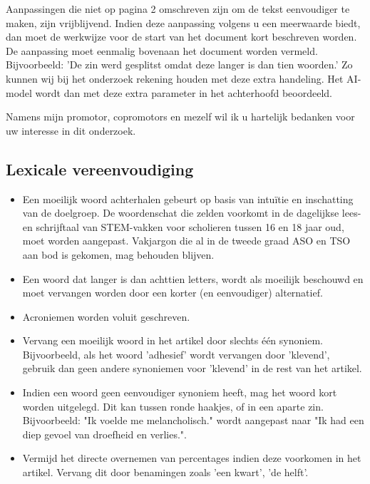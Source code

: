 	\medspace
	
Aanpassingen die niet op pagina 2 omschreven zijn om de tekst eenvoudiger te maken, zijn vrijblijvend. Indien deze aanpassing volgens u een meerwaarde biedt, dan moet de werkwijze voor de start van het document kort beschreven worden. De aanpassing moet eenmalig bovenaan het document worden vermeld. Bijvoorbeeld: 'De zin werd gesplitst omdat deze langer is dan tien woorden.' Zo kunnen wij bij het onderzoek rekening houden met deze extra handeling. Het AI-model wordt dan met deze extra parameter in het achterhoofd beoordeeld.
	
	\medspace
	
Namens mijn promotor, copromotors en mezelf wil ik u hartelijk bedanken voor uw interesse in dit onderzoek.
	
	\newpage
	
\subsection{Lexicale vereenvoudiging}
	
\begin{itemize}
	\item Een moeilijk woord achterhalen gebeurt op basis van intuïtie en inschatting van de doelgroep. De woordenschat die zelden voorkomt in de dagelijkse lees- en schrijftaal van STEM-vakken voor scholieren tussen 16 en 18 jaar oud, moet worden aangepast. Vakjargon die al in de tweede graad ASO en TSO aan bod is gekomen, mag behouden blijven.
	\item Een woord dat langer is dan achttien letters, wordt als moeilijk beschouwd en moet vervangen worden door een korter (en eenvoudiger) alternatief.
	\item Acroniemen worden voluit geschreven.
	\item Vervang een moeilijk woord in het artikel door slechts één synoniem. Bijvoorbeeld, als het woord 'adhesief' wordt vervangen door 'klevend', gebruik dan geen andere synoniemen voor 'klevend' in de rest van het artikel. 
	\item Indien een woord geen eenvoudiger synoniem heeft, mag het woord kort worden uitgelegd. Dit kan tussen ronde haakjes, of in een aparte zin. Bijvoorbeeld: "Ik voelde me melancholisch." wordt aangepast naar "Ik had een diep gevoel van droefheid en verlies.".		
		\item Vermijd het directe overnemen van percentages indien deze voorkomen in het artikel. Vervang dit door benamingen zoals 'een kwart', 'de helft'. 
	\end{itemize}
	
